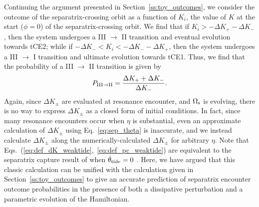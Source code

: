 \documentclass[
        fleqn,
        usenatbib,
        referee,
    ]{mnras}
\begin{document}
Continuing the argument presented in Section~\ref{ss:toy_outcomes}, we consider
the outcome of the separatrix-crossing orbit as a function of $K_i$, the value
of $K$ at the start ($\phi = 0$) of the separatrix-crossing orbit. We find that
if $K_i > -\Delta K_+ - \Delta K_-$, then the system undergoes a III $\to$ II
transition and eventual evolution towards tCE2; while if $-\Delta K_- < K_i <
-\Delta K_- - \Delta K_+$, then the system undergoes a III $\to$ I transition
and ultimate evolution towards tCE1. Thus, we find that the probability of a III
$\to$ II transition is given by
\begin{equation}
    P_{\rm III \to II} = \frac{\Delta K_+ + \Delta K_-}{\Delta
        K_-}.\label{eq:def_pc_weaktide}
\end{equation}
Again, since $\Delta K_{\pm}$ are evaluated at resonance encounter, and
$\Omega_{\rm s}$ is evolving, there is no way to express $\Delta K_{\pm}$ as a
closed form of initial conditions. In fact, since many resonance encounters
occur when $\eta$ is substantial, even an approximate calculation of $\Delta
K_{\pm}$ using Eq.~\eqref{eq:sep_theta} is inaccurate, and we instead calculate
$\Delta K_{\pm}$ along the numerically-calculated $\Delta K_{\pm}$ for arbitrary
$\eta$. Note that Eqs.~(\ref{eq:def_dK_weaktide},~\ref{eq:def_pc_weaktide}) are
equivalent to the separatrix capture result of \citet{henrard1982} when
$\dot{\theta}_{\rm tide} = 0$ \citep{henrard1987}. Here, we have argued that
this classic calculation can be unified with the calculation given in
Section~\ref{ss:toy_outcomes} to give an accurate prediction of separatrix
encounter outcome probabilities in the presence of both a dissipative
perturbation and a parametric evolution of the Hamiltonian.
\end{document}
